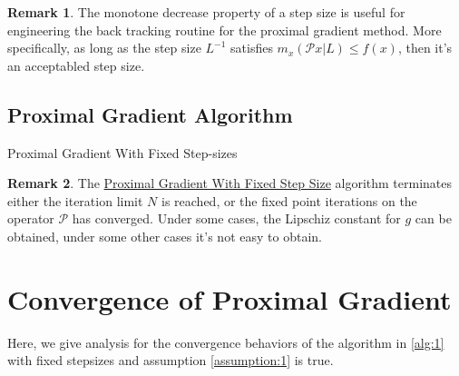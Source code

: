 \documentclass[]{article}
\theoremstyle{definition}
\newtheorem{remark}{Remark}[subsection]
{
    \newtheorem{assumption}{Assumption}
}
\begin{document}
        \begin{remark}
            The monotone decrease property of a step size is useful for engineering the back tracking routine for the proximal gradient method. More specifically, as long as the step size $L^{-1}$ satisfies $m_x(\mathcal Px | L)\le f(x)$, then it's an acceptabled step size. 
        \end{remark}
    \subsection{Proximal Gradient Algorithm}
        \begin{algorithm}[H]
            \begin{algorithmic}[1]
                \ENDIF
            \ENDFOR
            \end{algorithmic}
            \caption{Proximal Gradient With Fixed Step-sizes}
            \label{alg:1}
        \end{algorithm}
        \begin{remark}
            The \hyperref[alg:1]{Proximal Gradient With Fixed Step Size} algorithm terminates either the iteration limit $N$ is reached, or the fixed point iterations on the operator $\mathcal P$ has converged. Under some cases, the Lipschiz constant for $g$ can be obtained, under some other cases it's not easy to obtain. 
        \end{remark}

\section{Convergence of Proximal Gradient}\label{sec:pg_convergence}
    Here, we give analysis for the convergence behaviors of the algorithm in \hyperref[alg:1]{\ref*{alg:1}} with fixed stepsizes and assumption \hyperref[assumption:1]{\ref*{assumption:1}} is true. 
\end{document}
